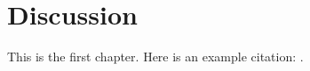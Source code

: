 \chapter{Discussion}
\label{chap:discussion}

This is the first chapter.  Here is an example citation:
\citet{rountree98}.
